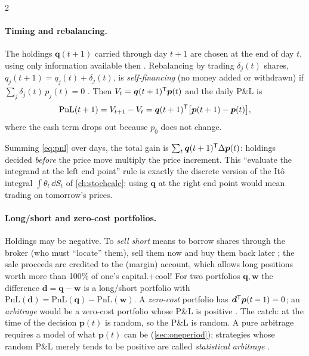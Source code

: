 \begin{paracol}{2}
\paragraph{Timing and rebalancing.} The holdings $\bm q(t+1)$ carried through day $t+1$ are chosen at
the end of day $t$, using only information available then . Rebalancing by trading
$\delta_j(t)$ shares, $q_j(t+1) = q_j(t)+\delta_j(t)$, is \emph{self-financing} (no money added or
withdrawn) if $\sum_j \delta_j(t)\,p_j(t) = 0$ . Then $V_t = \bm q(t+1)^{\mathsf T}\bm p(t)$ and
the daily P\&L is
\begin{equation}\label{eq:pnl}
  \mathrm{PnL}(t+1) = V_{t+1} - V_t = \bm q(t+1)^{\mathsf T}\bigl[\bm p(t+1)-\bm p(t)\bigr],
\end{equation}
where the cash term drops out because $p_0$ does not change.

\begin{intuition}
Summing \eqref{eq:pnl} over days, the total gain is $\sum_t \bm q(t+1)^{\mathsf T}\Delta\bm p(t)$: holdings decided
\emph{before} the price move multiply the price increment. This ``evaluate the integrand at the left end
point'' rule is exactly the discrete version of the Itô integral $\int \theta_t\,\dd S_t$ of
\cref{ch:stochcalc}; using $\bm q$ at the right end point would mean trading on tomorrow's prices.
\end{intuition}

\paragraph{Long/short and zero-cost portfolios.} Holdings may be negative. To \emph{sell short}
means to borrow shares through the broker (who must ``locate'' them), sell them now and buy
them back later ; the sale proceeds are credited to the (margin) account, which allows long positions
worth more than 100\% of one's capital.\note+{cool!} For two portfolios $\bm q,\bm w$ the difference $\bm d=\bm q-\bm w$
is a long/short portfolio with $\mathrm{PnL}(\bm d)=\mathrm{PnL}(\bm q)-\mathrm{PnL}(\bm w)$.
A \emph{zero-cost} portfolio has $\bm d^{\mathsf T}\bm p(t-1)=0$; an \emph{arbitrage} would be a zero-cost
portfolio whose P\&L is positive . The catch: at the time of the decision
$\bm p(t)$ is random, so the P\&L is random. A pure arbitrage requires a model of what $\bm p(t)$ can
be (\cref{sec:oneperiod}); strategies whose random P\&L merely tends to be positive are called
\emph{statistical arbitrage} .


\end{paracol}

